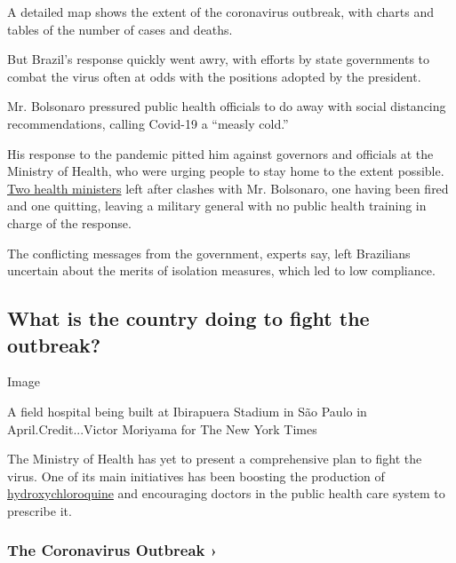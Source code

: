 A detailed map shows the extent of the coronavirus outbreak, with charts
and tables of the number of cases and deaths.

But Brazil's response quickly went awry, with efforts by state
governments to combat the virus often at odds with the positions adopted
by the president.

Mr. Bolsonaro pressured public health officials to do away with social
distancing recommendations, calling Covid-19 a ``measly cold.''

His response to the pandemic pitted him against governors and officials
at the Ministry of Health, who were urging people to stay home to the
extent possible.
\href{https://www.nytimes3xbfgragh.onion/2020/05/15/world/americas/brazil-health-minister-bolsonaro.html}{Two
health ministers} left after clashes with Mr. Bolsonaro, one having been
fired and one quitting, leaving a military general with no public health
training in charge of the response.

The conflicting messages from the government, experts say, left
Brazilians uncertain about the merits of isolation measures, which led
to low compliance.

\hypertarget{what-is-the-country-doing-to-fight-the-outbreak}{%
\subsection{What is the country doing to fight the
outbreak?}\label{what-is-the-country-doing-to-fight-the-outbreak}}

Image

A field hospital being built at Ibirapuera Stadium in São Paulo in
April.Credit...Victor Moriyama for The New York Times

The Ministry of Health has yet to present a comprehensive plan to fight
the virus. One of its main initiatives has been boosting the production
of
\href{https://www.nytimes3xbfgragh.onion/2020/05/20/world/coronavirus-world-tracker.html}{hydroxychloroquine}
and encouraging doctors in the public health care system to prescribe
it.

\href{https://www.nytimes3xbfgragh.onion/news-event/coronavirus?action=click\&pgtype=Article\&state=default\&region=MAIN_CONTENT_3\&context=storylines_faq}{}

\hypertarget{the-coronavirus-outbreak-}{%
\subsubsection{The Coronavirus Outbreak
›}\label{the-coronavirus-outbreak-}}

